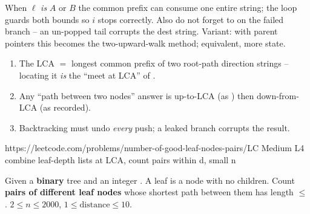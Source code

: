 
\begin{warningbox}
When $\ell$ \emph{is} $A$ or $B$ the common prefix can consume one entire string; the loop
guards both bounds so $i$ stops correctly. Also do not forget to  on the
failed  branch -- an un-popped tail corrupts the dest string. Variant: with parent
pointers this becomes the two-upward-walk method; equivalent, more state.
\end{warningbox}

\begin{insightbox}
\begin{enumerate}[nosep, leftmargin=1.6em]
  \item The LCA $=$ longest common prefix of two root-path direction strings -- locating it
        \emph{is} the ``meet at LCA'' of .
  \item Any ``path between two nodes'' answer is up-to-LCA (as ) then down-from-LCA
        (as recorded).
  \item Backtracking must undo \emph{every} push; a leaked branch corrupts the result.
\end{enumerate}
\end{insightbox}

  {https://leetcode.com/problems/number-of-good-leaf-nodes-pairs/}{LC Medium L4}
  {combine leaf-depth lists at LCA, count pairs within d, small n}

\begin{problemstatement}
Given a \textbf{binary} tree  and an integer . A leaf is a node with
no children. Count \textbf{pairs of different leaf nodes} whose shortest path between them has
length $\le$ . $2 \le n \le 2000$, $1 \le \text{distance} \le 10$.
\end{problemstatement}

